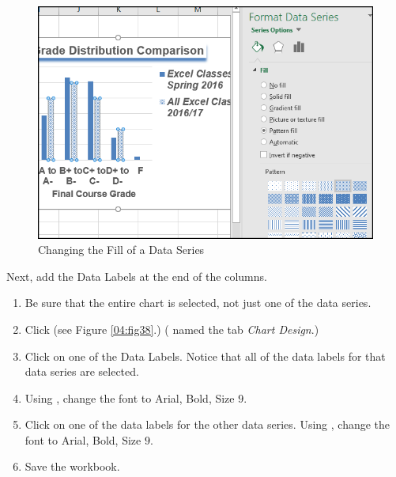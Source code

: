 \begin{figure}[H]
	\centering
	\includegraphics[width=\maxwidth{.95\linewidth}]{gfx/ch04_fig37}
	\caption{Changing the Fill of a Data Series}
	\label{04:fig37}
\end{figure}

Next, add the Data Labels at the end of the columns.

\begin{enumerate}
	\item Be sure that the entire chart is selected, not just one of the data series. 
	\item Click  (see Figure \ref{04:fig38}.) ( named the tab \textit{Chart Design}.)
	\item Click on one of the Data Labels. Notice that all of the data labels for that data series are selected.
	\item Using , change the font to Arial, Bold, Size $ 9 $.
	\item Click on one of the data labels for the other data series. Using , change the font to Arial, Bold, Size $ 9 $.
	\item Save the  workbook.
\end{enumerate}

